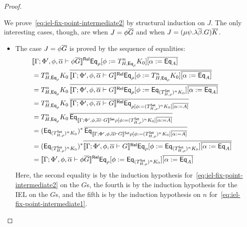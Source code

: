 \documentclass[runningheads]{llncs}
\newcommand{\set}{\mathsf{Set}}
\begin{document}
\begin{proof}
\begin{itemize}
We prove~\eqref{eq:iel-fix-point-intermediate2} by structural
induction on $J$. The only interesting cases, though, are when
$J = \phi \overline{G}$ and when $J = (\mu \psi.\lambda \overline{\beta}. G)\overline{K}$.
\begin{itemize}
\item The case $J = \phi \overline{G}$ is proved by the sequence of equalities:
\[
\begin{split}
& \relsem{\Gamma; \Phi', \phi, \ol{\alpha} \vdash \phi
    \ol{G}} \Eq_{\rho} [\phi := T^{n}_{H,\Eq_{\rho}} K_0]
  \overline{[\alpha := \Eq_A]}
  \\
&= T^{n}_{H,\Eq_{\rho}} K_0\, \overline{\relsem{\Gamma; \Phi',
      \phi, \ol{\alpha} \vdash G} \Eq_{\rho} [\phi :=
      T^{n}_{H,\Eq_{\rho}} K_0] \overline{[\alpha :=
        \Eq_A]}} \\ 
&= T^{n}_{H,\Eq_{\rho}} K_0\, \overline{\relsem{\Gamma; \Phi',
      \phi, \ol{\alpha} \vdash G} \Eq_{\rho} [\phi :=
      \Eq_{(T^\set_{H,\rho})^{n} K_0}] \overline{[\alpha :=
        \Eq_A]}} \\ 
&= T^{n}_{H,\Eq_{\rho}} K_0\, \overline{\relsem{\Gamma; \Phi',
      \phi, \ol{\alpha} \vdash G} \Eq_{\rho [\phi := (T^\set_{H,\rho})^{n}
        K_0] \overline{[\alpha := A]}}} \\ 
&= T^{n}_{H,\Eq_{\rho}} K_0\, \overline{\Eq_{\setsem{\Gamma;
        \Phi', \phi, \ol{\alpha} \vdash G} \rho [\phi :=
        (T^\set_{H,\rho})^{n} K_0] \overline{[\alpha :=
          A]}}} \\ 
&= (\Eq_{(T^\set_{H,\rho})^{n} K_0})^* \,\overline{\Eq_{\setsem{\Gamma;
        \Phi', \phi, \ol{\alpha} \vdash G} \rho [\phi :=
        (T^\set_{H,\rho})^{n} K_0] \overline{[\alpha :=
          A]}}} \\ 
&= (\Eq_{(T^\set_{H,\rho})^{n} K_0})^* \overline{\relsem{\Gamma;
      \Phi', \phi, \ol{\alpha} \vdash G} \Eq_{\rho} [\phi :=
      \Eq_{(T^\set_{H,\rho})^{n} K_0}] \overline{[\alpha :=
        \Eq_A]}} \\ 
&= \relsem{\Gamma; \Phi', \phi, \ol{\alpha} \vdash \phi \ol{G}}
  \Eq_{\rho} [\phi := \Eq_{(T^\set_{H,\rho})^{n} K_0}]
  \overline{[\alpha := \Eq_A]} 
\end{split}
\]
Here, the second equality is by the induction hypothesis
for~\eqref{eq:iel-fix-point-intermediate2} on the $G$s, the fourth is
by the induction hypothesis for the IEL on the $G$s, and the fifth is
by the induction hypothesis on $n$
for~\eqref{eq:iel-fix-point-intermediate1}.


\end{itemize}
\end{itemize}
\end{proof}
\end{document}
